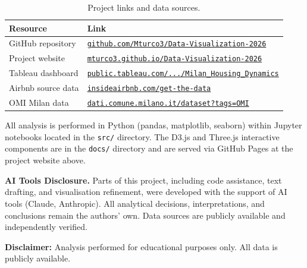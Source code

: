 \documentclass[11pt, a4paper]{article}
\begin{document}
\begin{table}[h!]
\centering
\renewcommand{\arraystretch}{1.4}
\begin{tabular}{p{3.5cm} p{9.5cm}}
\toprule
\textbf{Resource} & \textbf{Link} \\
\midrule
GitHub repository &
  \href{https://github.com/Mturco3/Data-Visualization-2026}%
       {\texttt{github.com/Mturco3/Data-Visualization-2026}} \\
Project website &
  \href{https://mturco3.github.io/Data-Visualization-2026/}%
       {\texttt{mturco3.github.io/Data-Visualization-2026}} \\
Tableau dashboard &
  \href{https://public.tableau.com/app/profile/michele.turco/viz/Milan_Housing_Dynamics/Dashboard1}%
       {\texttt{public.tableau.com/.../Milan\_Housing\_Dynamics}} \\
Airbnb source data &
  \href{https://insideairbnb.com/get-the-data/}%
       {\texttt{insideairbnb.com/get-the-data}} \\
OMI Milan data &
  \href{https://dati.comune.milano.it/dataset?tags=OMI}%
       {\texttt{dati.comune.milano.it/dataset?tags=OMI}} \\
\bottomrule
\end{tabular}
\caption{Project links and data sources.}
\end{table}

All analysis is performed in Python (pandas, matplotlib, seaborn) within Jupyter notebooks
located in the \texttt{src/} directory. The D3.js and Three.js interactive components are
in the \texttt{docs/} directory and are served via GitHub Pages at the project website above.

\medskip
\begin{mdframed}[style=aibox]
  \textbf{AI Tools Disclosure.}
  Parts of this project, including code assistance, text drafting, and visualisation
  refinement, were developed with the support of AI tools (Claude, Anthropic).
  All analytical decisions, interpretations, and conclusions remain the authors' own.
  Data sources are publicly available and independently verified.
\end{mdframed}

\medskip
\noindent\textbf{Disclaimer:}
Analysis performed for educational purposes only. All data is publicly available.
\end{document}
